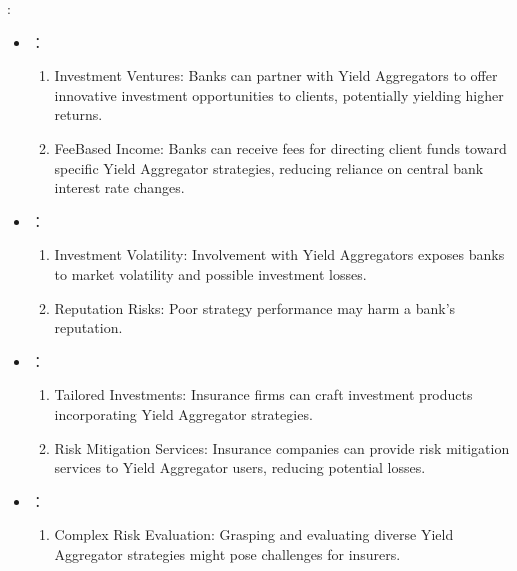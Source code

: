 \documentclass[letterpaper,10pt,english]{jupyterBook}
\begin{document}
\sphinxAtStartPar
{}:
\begin{itemize}
\item {} 
\sphinxAtStartPar
{}：
\begin{enumerate}
%
\item {} 
\sphinxAtStartPar
Investment Ventures: Banks can partner with Yield Aggregators to offer innovative investment opportunities to clients, potentially yielding higher returns.

\item {} 
\sphinxAtStartPar
Fee\sphinxhyphen{}Based Income: Banks can receive fees for directing client funds toward specific Yield Aggregator strategies, reducing reliance on central bank interest rate changes.

\end{enumerate}

\item {} 
\sphinxAtStartPar
{}：
\begin{enumerate}
%
\item {} 
\sphinxAtStartPar
Investment Volatility: Involvement with Yield Aggregators exposes banks to market volatility and possible investment losses.

\item {} 
\sphinxAtStartPar
Reputation Risks: Poor strategy performance may harm a bank’s reputation.

\end{enumerate}

\item {} 
\sphinxAtStartPar
{}：
\begin{enumerate}
%
\item {} 
\sphinxAtStartPar
Tailored Investments: Insurance firms can craft investment products incorporating Yield Aggregator strategies.

\item {} 
\sphinxAtStartPar
Risk Mitigation Services: Insurance companies can provide risk mitigation services to Yield Aggregator users, reducing potential losses.

\end{enumerate}

\item {} 
\sphinxAtStartPar
{}：
\begin{enumerate}
%
\item {} 
\sphinxAtStartPar
Complex Risk Evaluation: Grasping and evaluating diverse Yield Aggregator strategies might pose challenges for insurers.


\end{enumerate}
\end{itemize}
\end{document}
